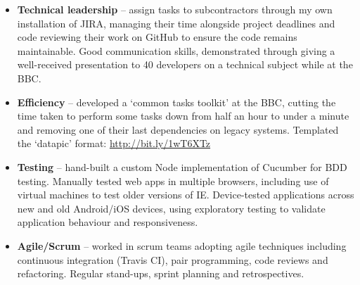 \documentclass[a4paper,10pt]{article}
\begin{document}
\begin{itemize}
    \item \textbf{Technical leadership} – assign tasks to subcontractors through my own installation of JIRA, managing their time alongside project deadlines and code reviewing their work on GitHub to ensure the code remains maintainable. Good communication skills, demonstrated through giving a well-received presentation to 40 developers on a technical subject while at the BBC.

    \item \textbf{Efficiency} – developed a ‘common tasks toolkit’ at the BBC, cutting the time taken to perform some tasks down from half an hour to under a minute and removing one of their last dependencies on legacy systems. Templated the ‘datapic’ format: \url{http://bit.ly/1wT6XTz}

    \item \textbf{Testing} – hand-built a custom Node implementation of Cucumber for BDD testing. Manually tested web apps in multiple browsers, including use of virtual machines to test older versions of IE. Device-tested applications across new and old Android/iOS devices, using exploratory testing to validate application behaviour and responsiveness.

    \item \textbf{Agile/Scrum} – worked in scrum teams adopting agile techniques including continuous integration (Travis CI), pair programming, code reviews and refactoring. Regular stand-ups, sprint planning and retrospectives.

\end{itemize}
\end{document}

